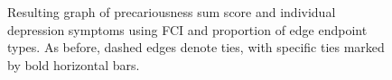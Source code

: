 \documentclass[
]{article}
\begin{document}
\begin{figure}

\begin{minipage}{\linewidth}



\end{minipage}%
\newline
\begin{minipage}{\linewidth}



\end{minipage}%

\caption{\label{fig-presum}Resulting graph of precariousness sum score
and individual depression symptoms using FCI and proportion of edge
endpoint types. As before, dashed edges denote ties, with specific ties
marked by bold horizontal bars.}

\end{figure}%
\end{document}
